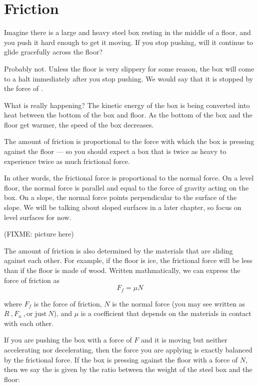 \chapter{Friction}

Imagine there is a large and heavy steel box resting in the middle of a floor, and you push it hard enough to get it moving. If you stop pushing, will it continue to glide gracefully across the floor? 

Probably not. Unless the floor is very slippery for some reason, the box will come to a halt immediately after you stop pushing. We would say that it is stopped by the force of . 

What is really happening? The kinetic energy of the box is being converted into heat 
between the bottom of the box and floor. As the bottom of the box and the floor get warmer, the speed of the box decreases.

The amount of friction is proportional to the force with which the box is pressing against the floor --- so you should expect a box that is twice as heavy to experience twice as much frictional force.

In other words, the frictional force is proportional to the normal force. On a level floor, the normal force is parallel and equal to the force of gravity acting on the box. On a slope, the normal force points perpendicular to the surface of the slope. We will be talking about sloped surfaces in a later chapter, so focus on level surfaces for now. 

(FIXME: picture here)

The amount of friction is also determined by the materials that are sliding against each other. For example, if the floor is ice, the frictional force will be less than if the floor is made of wood. Written mathmatically, we can express the force of friction as
$$F_{f} = \mu N$$

where $F_{f}$ is the force of friction, $N$ is the normal force (you may see written as $R \ , F_{n} \ , \text{or just} \ N$), and $\mu$ is a coefficient that depends on the materials in contact with each other.

If you are pushing the box with a force of $F$ and it is moving but neither accelerating nor decelerating, then the force you are applying is exactly balanced by the frictional force. If the box is pressing against the floor with a force of $N$, then we say the  is given by the ratio between the weight of the steel box and the floor:

